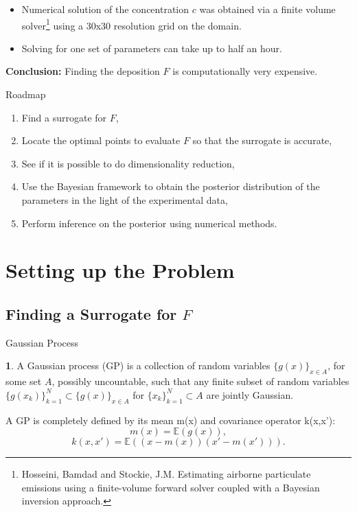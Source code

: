 \documentclass[11pt]{beamer}
\theoremstyle{plain}
\theoremstyle{definition}
\newtheorem{dfn}{}[section]
\begin{document}
\begin{frame}
\begin{itemize}

\item Numerical solution of the concentration $c$ was obtained via 
a finite volume solver\footnote{Hosseini, Bamdad and Stockie, J.M. Estimating airborne particulate emissions using a finite-volume
forward solver coupled with a Bayesian inversion approach.}
using a 30x30 resolution grid on the domain.



\item Solving for one set of parameters can take up to half an hour.
\end{itemize}

\textbf{Conclusion:} Finding the deposition $F$  is computationally very expensive.
\end{frame}






\begin{frame}{Roadmap}
\begin{enumerate}
\item Find a surrogate for $F$,
\item Locate the optimal points to evaluate $F$ so that the surrogate is accurate,
\item See if it is possible to do dimensionality reduction,
\item Use the Bayesian framework to obtain the posterior distribution of the parameters 
in the light of the experimental data,
\item Perform inference on the posterior using numerical methods.
\end{enumerate}
\end{frame}  


\section{Setting up the Problem}

\subsection{Finding a Surrogate for $F$}


\begin{frame}{Gaussian Process}
\begin{dfn} 
A Gaussian process (GP) is a collection of random variables $\{g(x)\}_{x\in A}$, for some set $A$,
possibly uncountable,
 such that any finite subset of random variables
 $\{g(x_{k})\}_{k=1}^{N}\subset\{g(x)\}_{x\in A}$ for
$\{x_{k}\}_{k=1}^{N}\subset A$ are jointly Gaussian.

A GP is completely defined by its mean m(x) and covariance operator k(x,x'):
\begin{equation*}
m(x)=\mathbb{E}(g(x)),
\end{equation*}
\begin{equation*}
k(x,x')=\mathbb{E}\left((x-m(x))(x'-m(x'))\right).
\end{equation*}

\end{dfn}
\end{frame}
\end{document}
